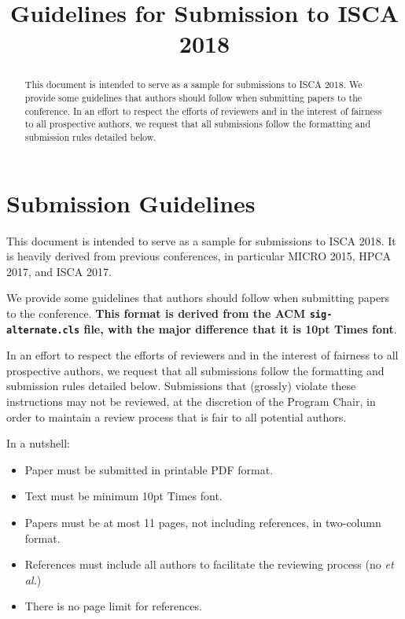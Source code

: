 \documentclass{sig-alternate}
\title{Guidelines for Submission to ISCA 2018}
\author{}
\begin{document}
\maketitle
\thispagestyle{firstpage}
\pagestyle{plain}

\begin{abstract}

This document is intended to serve as a sample for submissions to ISCA 2018. We provide some guidelines that authors should follow when submitting papers to the conference. In an effort to respect the efforts of reviewers and in the interest of fairness to all prospective authors, we request that all submissions follow the formatting and submission rules detailed below. 

\end{abstract}

\section{Submission Guidelines}

This document is intended to serve as a sample for submissions to ISCA 2018. It is heavily derived from previous conferences, in particular MICRO 2015, HPCA 2017, and ISCA 2017.

We provide some guidelines that authors should follow when submitting papers to the conference. \textbf{This format is derived from the ACM \texttt{sig-alternate.cls} file, with the major difference that it is 10pt Times font}.

In an effort to respect the efforts of reviewers and in the interest of fairness to all prospective authors, we request that all submissions follow the formatting and submission rules detailed below. Submissions that (grossly) violate these instructions may not be reviewed, at the discretion of the Program Chair, in order to maintain a review process that is fair to all potential authors.

\vspace{1ex}In a nutshell:

\begin{itemize}
\item Paper must be submitted in printable PDF format.
\item Text must be minimum 10pt Times font.
\item Papers must be at most 11 pages, not including references, in two-column format.
\item References must include all authors to facilitate the reviewing process (no \emph{et al.})
\item There is no page limit for references.
\end{itemize}
\end{document}
